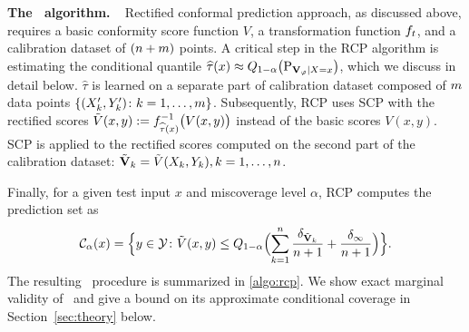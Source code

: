 \vspace{-10pt}
\textbf{The \RCP\ algorithm.} ~
  Rectified conformal prediction approach, as discussed above, requires a basic conformity score function \(V\), a transformation function \(f_{t}\), and a calibration dataset of $(n + m)$ points. A critical step in the RCP algorithm is estimating the conditional quantile \(\widehat{\tau}(x) \approx Q_{1-\alpha}\bigl(\textup{P}_{\mathbf{V}_\varphi \mid X = x} \bigr)\), which we discuss in detail below. \(\widehat{\tau}\) is learned on a separate part of calibration dataset composed of \(m\) data points \( \{(X_k', Y_k') \colon k = 1, \dots , m\} \). Subsequently, RCP uses SCP with the rectified scores $\tilde{V}(x, y) := f_{\widehat{\tau}(x)}^{-1} \bigl(V(x, y)\bigr)$ instead of the basic scores $V(x, y)$. SCP is applied to the rectified scores computed on the second part of the calibration dataset: $\tilde{\mathbf{V}}_k = \tilde{V}(X_{k}, Y_{k}), k = 1, \dots, n$.

  Finally, for a given test input \(x\) and miscoverage level \(\alpha\), RCP computes the prediction set as
  {\small
    \begin{equation}
    \label{eq:rcp_empirical}
      \mathcal{C}_{\alpha}(x) = \Bigl\{y \in \mathcal{Y}\colon \tilde{V}(x,y)  \leq Q_{1-\alpha}\Bigl(\sum_{k=1}^{n} \frac{\delta_{\tilde{\mathbf{V}}_k}}{n+1} + \frac{\delta_{\infty}}{n+1} \Bigr)\Bigr\}.
    \end{equation}
  }
  The resulting \RCP\ procedure is summarized in \cref{algo:rcp}. We show exact marginal validity of \RCP\ and give a bound on its approximate conditional coverage in Section~\ref{sec:theory} below. 

